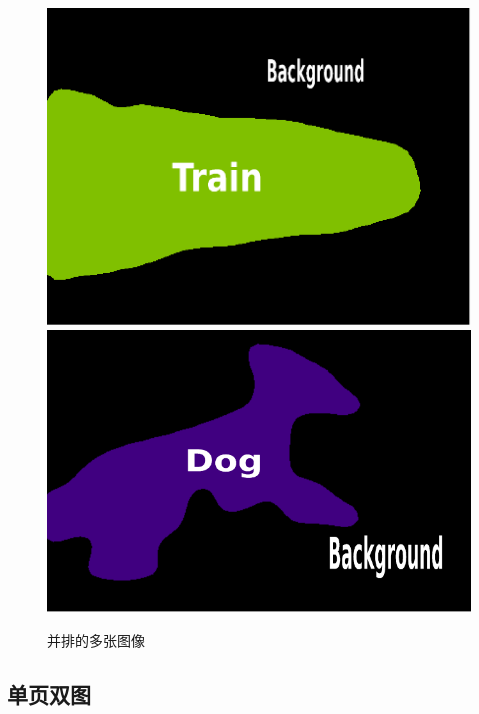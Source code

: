 \documentclass[
    fontset=fandol,
    xcolor=svgnames %
]{ctexbeamer}
\begin{document}
\begin{frame}
\begin{figure}
        \includegraphics[width=.2\textwidth,height=.15\textwidth]{../image/chap04/example/2007_004483.pdf}
        \includegraphics[width=.2\textwidth,height=.15\textwidth]{../image/chap04/example/2007_003194.pdf}
        \caption{并排的多张图像}
        \label{fig:multi-image-example1}
    \end{figure}

\end{frame}

\subsection{单页双图}
\end{document}
